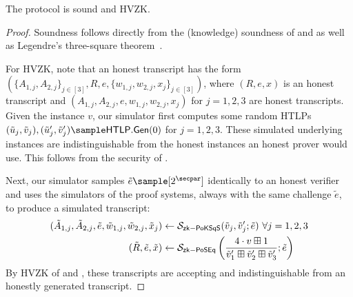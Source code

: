 \begin{theorem}[\zkpopos]
    The protocol \zkpopos is sound and HVZK.
\end{theorem}
\begin{proof}
    Soundness follows directly from the (knowledge) soundness of \zkposqs and \zkposeq as well as Legendre's three-square theorem~\cite{ACNS:Groth05}.

    For HVZK, note that an honest \zkpopos transcript has the form $( \{A_{1,j},\allowbreak A_{2,j}\}_{j\in[3]},\allowbreak R, e, \{w_{1,j}, w_{2,j}, x_j\}_{j\in[3]})$, where $(R, e, x)$ is an honest \zkposeq transcript and $(A_{1,j}, A_{2,j}, e, w_{1,j}, w_{2,j}, x_j)$ for $j=1,2,3$ are honest \zkposqs transcripts. Given the instance $v$, our \zkpopos simulator first computes some random HTLPs $(\tilde{u}_j, \tilde{v}_j), (\tilde{u}_j', \tilde{v}_j') \sample \htlp.{\sf Gen}(0)$ for $j=1,2,3$. These simulated underlying instances are indistinguishable from the honest instances an honest prover would use. This follows from the security of \htlp.
    
    Next, our simulator samples $\tilde{e} \sample [2^\secpar]$ identically to an honest verifier and uses the simulators of the proof systems, always with the same challenge $\tilde{e}$, to produce a simulated transcript: 
    \begin{align*}
    (\tilde{A}_{1,j}, \tilde{A}_{2,j}, \tilde{e}, \tilde{w}_{1,j}, \tilde{w}_{2,j}, \tilde{x}_j) &\gets \mathcal{S}_{{\sf zk-PoKSqS}}(\tilde{v}_j, \tilde{v}_j'; \tilde{e}) ~\forall j=1,2,3\\
    (\tilde{R}, \tilde{e}, \tilde{x}) &\gets \mathcal{S}_{{\sf zk-PoSEq}}\left(\frac{4 \cdot v \boxplus 1}{\tilde{v}_1' \boxplus \tilde{v}_2' \boxplus \tilde{v}_3'}; \tilde{e}\right)
    \end{align*}
    By HVZK of \zkposqs and \zkposeq, these transcripts are accepting and indistinguishable from an honestly generated transcript.
\end{proof}